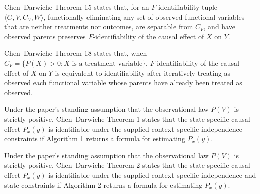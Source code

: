 Chen--Darwiche Theorem 15 states that, for an \(F\)-identifiability tuple \(\langle G,V,C_V,W\rangle\), functionally eliminating any set of observed functional variables that are neither treatments nor outcomes, are separable from \(C_V\), and have observed parents preserves \(F\)-identifiability of the causal effect of \(X\) on \(Y\).

Chen--Darwiche Theorem 18 states that, when \(C_V=\{P(X)>0:X\text{ is a treatment variable}\}\), \(F\)-identifiability of the causal effect of \(X\) on \(Y\) is equivalent to identifiability after iteratively treating as observed each functional variable whose parents have already been treated as observed.

Under the paper's standing assumption that the observational law \(P(V)\) is strictly positive, Chen--Darwiche Theorem 1 states that the state-specific causal effect \(P_x(y)\) is identifiable under the supplied context-specific independence constraints if Algorithm 1 returns a formula for estimating \(P_x(y)\).

Under the paper's standing assumption that the observational law \(P(V)\) is strictly positive, Chen--Darwiche Theorem 2 states that the state-specific causal effect \(P_x(y)\) is identifiable under the supplied context-specific independence and state constraints if Algorithm 2 returns a formula for estimating \(P_x(y)\).
